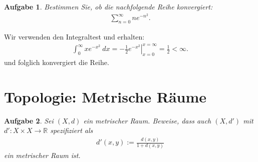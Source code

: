 \documentclass[a4paper, 20]{exam}
\newtheorem{ex}{Aufgabe}
\begin{document}
\begin{ex} Bestimmen Sie, ob die nachfolgende Reihe konvergiert:
\begin{align*}
\sum_{n=0}^\infty ne^{-n^2}.
\end{align*}
\end{ex}

\begin{solution} Wir verwenden den Integraltest und erhalten:
\begin{align*}
\int_0^\infty xe^{-x^2} ~dx = \left. - \frac{1}{2}e^{-x^2}\right|_{x=0}^{x=\infty} = \frac{1}{2} < \infty.
\end{align*}
und folglich konvergiert die Reihe. 
\end{solution}
\newpage

\section{Topologie: Metrische Räume}
\begin{ex} Sei $(X,d)$ ein metrischer Raum. Beweise, dass auch $(X,d')$ mit  $d': X \times X \to \mathbb{R}$ spezifiziert als 
\begin{align*}
d'(x,y):= \frac{d(x,y)}{1+d(x,y)}
\end{align*}
ein metrischer Raum ist.
\end{ex}
\end{document}
